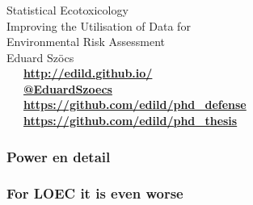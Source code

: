 \documentclass[
	10pt
	]{beamer}
\begin{document}
\begin{frame}[standout]
	\frametitle{}

	\vspace{1em}
	\Huge{Statistical Ecotoxicology} \\[0.3em]
	\large{Improving the Utilisation of Data for \\ Environmental Risk Assessment} \\[1em]

	\normalsize
	Eduard Szöcs \\[3em]

	\faLaptop~~~\textbf{\href{http://edild.github.io/}{http://edild.github.io/ }}\\[.5em]
	\faTwitter~~~\textbf{\href{http://twitter.com/EduardSzoecs}{@EduardSzoecs}} 	\\[0.5em]
	\faFilePowerpointO~~~\textbf{\href{https://github.com/edild/phd_defense}{https://github.com/edild/phd\_defense}}\\[0.5em]
	\faBook~~~\textbf{\href{https://github.com/edild/phd_thesis}{https://github.com/edild/phd\_thesis}}\\[3em]

	\begin{center}\ccbysa\end{center} 

\end{frame}


\appendix

\begin{frame}
\frametitle{Power en detail}
	\begin{adjustbox}{max totalsize={\textwidth}{\textheight}}
				
	\end{adjustbox}
\end{frame}


\begin{frame}
\frametitle{For LOEC it is even worse}
	\begin{adjustbox}{max totalsize={\textwidth}{\textheight}}
				
	\end{adjustbox}
\end{frame}
\end{document}
